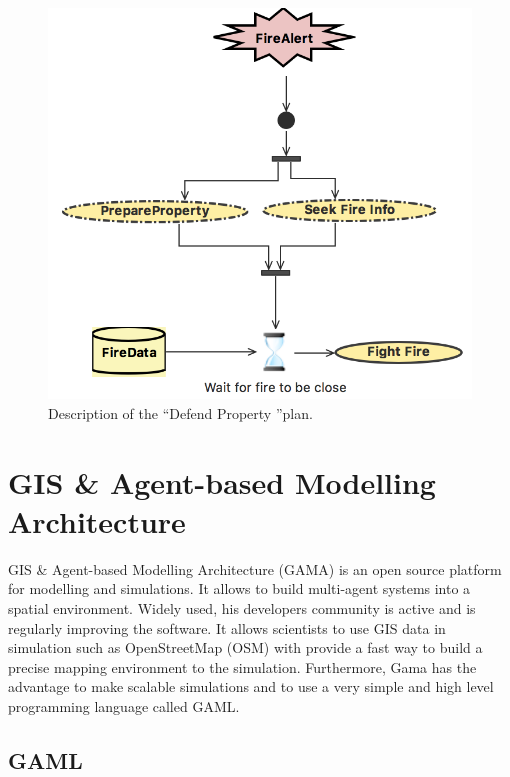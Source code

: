 \documentclass[12pt, a4paper]{memoir} %
\begin{document}
				\begin{figure}
					\begin{center}
						\includegraphics[scale=0.4]{plan.png}
						\caption{\label{fig:plan} Description of the \textquotedblleft Defend Property \textquotedblright plan.}
					\end{center}
				\end{figure}

	\section{GIS \& Agent-based Modelling Architecture}
		GIS \& Agent-based Modelling Architecture (GAMA) is an open source platform for modelling and simulations.
		It allows to build multi-agent systems into a spatial environment.
		Widely used, his developers community is active and is regularly improving the software. It allows scientists to use GIS data in simulation such as OpenStreetMap (OSM) with provide a fast way to build a precise mapping environment to the simulation. Furthermore, Gama has the advantage to make scalable simulations and to use a very simple and high level programming language called GAML\cite{gamawebsite,caillou2015,taillandier2016}.

		\subsection{GAML}
\end{document}
